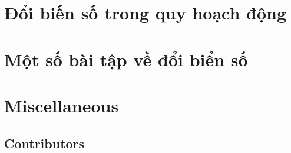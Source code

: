 \documentclass{article}
\begin{document}
\section{Đổi biến số trong quy hoạch động}

\section{Một số bài tập về đổi biển số}



\section{Miscellaneous}

\subsection{Contributors}



\printbibliography[heading=bibintoc]
	
\end{document}
